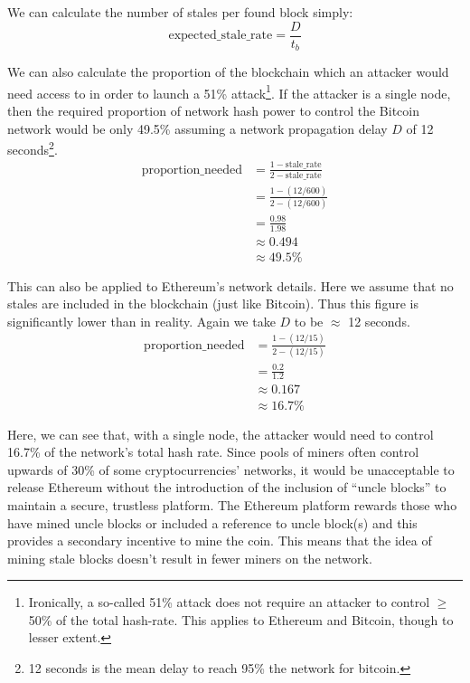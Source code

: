 \documentclass{article}
\begin{document}
We can calculate the number of stales per found block simply:
\[\textrm{expected\_stale\_rate} = \frac{D}{t_b} \]

We can also calculate the proportion of the blockchain which an attacker would need access to in order to launch a 51\% attack\footnote{Ironically, a so-called 51\% attack does not require an attacker to control $\geq$ 50\% of the total hash-rate. This applies to Ethereum and Bitcoin, though to lesser extent.}. If the attacker is a single node, then the required proportion of network hash power to control the Bitcoin network would be only 49.5\% assuming a network propagation delay $D$ of 12 seconds\footnote{12 seconds\cite{twelve_s_for_btc} is the mean delay to reach 95\% the network for bitcoin.}.
\begin{align*}
    \textrm{proportion\_needed} &= \frac{1-\textrm{stale\_rate}} {2-\textrm{stale\_rate}} \\
    &= \frac{1 - (12 / 600)} {2 - (12 / 600)} \\
    &= \frac{0.98}{1.98} \\
    &\approx 0.494 \\
    &\approx 49.5\%
\end{align*}

This can also be applied to Ethereum's network details. Here we assume that no stales are included in the blockchain (just like Bitcoin). Thus this figure is significantly lower than in reality. Again we take $D$ to be $\approx$ 12 seconds.
\begin{align*}
    \textrm{proportion\_needed} &= \frac{1 - (12 / 15)} {2 - (12 / 15)} \\
    &= \frac{0.2}{1.2} \\
    &\approx 0.167 \\
    &\approx 16.7\%
\end{align*}

Here, we can see that, with a single node, the attacker would need to control 16.7\% of the network's total hash rate. Since pools of miners often control upwards of 30\% of some cryptocurrencies' networks, it would be unacceptable to release Ethereum without the introduction of the inclusion of ``uncle blocks'' to maintain a secure, trustless platform. The Ethereum platform rewards those who have mined uncle blocks or included a reference to uncle block(s) and this provides a secondary incentive to mine the coin. This means that the idea of mining stale blocks doesn't result in fewer miners on the network.
\end{document}
